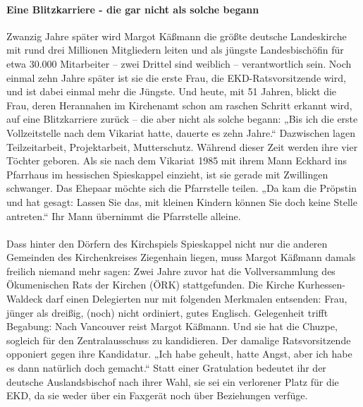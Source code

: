 \documentclass[a4paper,12pt,oneside]{scrbook}
\begin{document}
\paragraph{Eine Blitzkarriere - die gar nicht als solche begann}
Zwanzig Jahre später wird Margot Käßmann die größte deutsche Landeskirche mit rund drei Millionen Mitgliedern leiten und als jüngste Landesbischöfin für etwa 30.000 Mitarbeiter – zwei Drittel sind weiblich – verantwortlich sein. Noch einmal zehn Jahre später ist sie die erste Frau, die EKD-Ratsvorsitzende wird, und ist dabei einmal mehr die Jüngste. Und heute, mit 51 Jahren, blickt die Frau, deren Herannahen im Kirchenamt schon am raschen Schritt erkannt wird, auf eine Blitzkarriere zurück – die aber nicht als solche begann: „Bis ich die erste Vollzeitstelle nach dem Vikariat hatte, dauerte es zehn Jahre.“ Dazwischen lagen Teilzeitarbeit, Projektarbeit, Mutterschutz. Während dieser Zeit werden ihre vier Töchter geboren. Als sie nach dem Vikariat 1985 mit ihrem Mann Eckhard ins Pfarrhaus im hessischen Spieskappel einzieht, ist sie gerade mit Zwillingen schwanger. Das Ehepaar möchte sich die Pfarrstelle teilen. „Da kam die Pröpstin und hat gesagt: Lassen Sie das, mit kleinen Kindern können Sie doch keine Stelle antreten.“ Ihr Mann übernimmt die Pfarrstelle alleine.
\\\\
Dass hinter den Dörfern des Kirchspiels Spieskappel nicht nur die anderen Gemeinden des Kirchenkreises Ziegenhain liegen, muss Margot Käßmann damals freilich niemand mehr sagen: Zwei Jahre zuvor hat die Vollversammlung des Ökumenischen Rats der Kirchen (ÖRK) stattgefunden. Die Kirche Kurhessen-Waldeck darf einen Delegierten nur mit folgenden Merkmalen entsenden: Frau, jünger als dreißig, (noch) nicht ordiniert, gutes Englisch. Gelegenheit trifft Begabung: Nach Vancouver reist Margot Käßmann. Und sie hat die Chuzpe, sogleich für den Zentralausschuss zu kandidieren. Der damalige Ratsvorsitzende opponiert gegen ihre Kandidatur. „Ich habe geheult, hatte Angst, aber ich habe es dann natürlich doch gemacht.“ Statt einer Gratulation bedeutet ihr der deutsche Auslandsbischof nach ihrer Wahl, sie sei ein verlorener Platz für die EKD, da sie weder über ein Faxgerät noch über Beziehungen verfüge.
\end{document}
